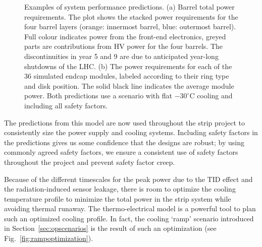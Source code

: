 \begin{figure}[ht]
\centering
{}\quad\quad
{}
\caption{Examples of system performance predictions. (a) Barrel total power requirements. The plot shows the stacked power requirements for the four barrel layers (orange: innermost barrel, blue: outermost barrel). Full colour indicates power from the front-end electronics, greyed parts are contributions from HV power for the four barrels. The discontinuities in year 5 and 9 are due to anticipated year-long shutdowns of the LHC. (b) The power requirements for each of the 36 simulated endcap modules, labeled according to their ring type and disk position. The solid black line indicates the average module power. Both predictions use a scenario with flat $-30^\circ$C cooling and including all safety factors.}
\label{fig:systemperformance}
\end{figure}

The predictions from this model are now used throughout the strip project to consistently size the power supply and cooling systems. Including safety factors in the predictions gives us some confidence that the designs are robust; by using commonly agreed safety factors, we ensure a consistent use of safety factors throughout the project and prevent safety factor creep.

Because of the different timescales for the peak power due to the TID effect and the radiation-induced sensor leakage, there is room to optimize the cooling temperature profile to minimize the total power in the strip system while avoiding thermal runaway. The thermo-electrical model is a powerful tool to plan such an optimized cooling profile. In fact, the cooling `ramp' scenario introduced in Section~\ref{sec:opscenarios} is the result of such an optimization (see Fig.~\ref{fig:rampoptimization}).


